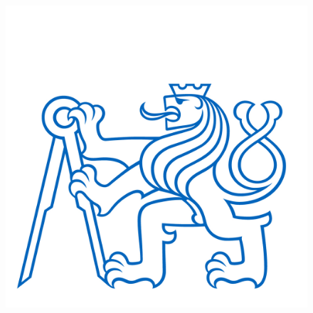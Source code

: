 \thispagestyle{empty}

\vspace*{-10mm}

\begin{center}
    {\Large \bf \cvut\\[2mm] \fjfi\\ }
    \vspace{3mm}
    
    {\large \bf \kdaiz}\\
     \vspace{2mm}  
   
   \vspace{0mm}

\begin{figure}[h]
\begin{center}
	\includegraphics[scale=1.5]{cvut.jpg}
\end{center}
\end{figure}

    \vspace{5mm}


   \vspace{0mm}
   {\Huge\textbf{\MakeUppercase{\typprace}}}

   \vspace{15mm}
   {\Large \textbf{\nazevcz}}
   
\end{center}

